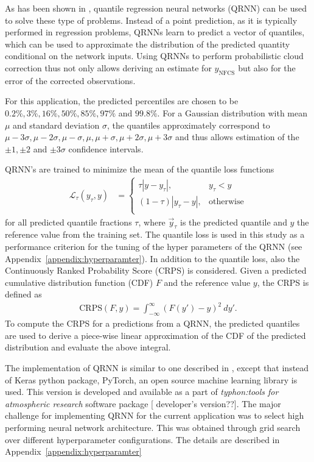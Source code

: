 \documentclass[amt, manuscript]{copernicus}
\newcommand{\todo}[1]{{\color{red} #1}}
\newcommand{\ynfcs}{y_\text{NFCS}}
\newcommand{\y}{\vec{y}}
\begin{document}
As has been shown in \citet{pfreundschuh:aneur:18}, quantile regression neural
networks (QRNN) can be used to solve these type of problems. Instead of a point
prediction, as it is typically performed in regression problems, QRNNs learn to
predict a vector of quantiles, which can be used to approximate the distribution
of the predicted quantity conditional on the network inputs. Using QRNNs to
perform probabilistic cloud correction thus not only allows deriving an estimate
for $\ynfcs$ but also for the error of the corrected observations.

For this application, the predicted percentiles are chosen to be
$0.2\%, 3\%, 16\%, 50\%, 85\%, 97\%$ and $99.8\%$. For a Gaussian
distribution with mean $\mu$ and standard deviation $\sigma$, the quantiles
approximately correspond to $\mu -3\sigma, \mu-2\sigma, \mu-\sigma
, \mu, \mu + \sigma, \mu + 2\sigma, \mu + 3\sigma$ and thus allows
estimation of the $\pm 1, \pm 2$ and $\pm 3\sigma$ confidence intervals.

QRNN's are trained to minimize the mean of the quantile loss functions
%
\begin{align}
  \mathcal{L}_\tau(y_\tau, y) &=
  \begin{cases}
    \tau|y - y_\tau|, & y_\tau < y \\ (1 - \tau)|y_\tau - y|, & \text{otherwise}
    \\
  \end{cases}
\end{align}
%
for all predicted quantile fractions $\tau$, where $\y_\tau$ is the predicted
quantile and $y$ the reference value from the training set. The quantile loss is
used in this study as a performance criterion for the tuning of the hyper
parameters of the QRNN (see Appendix~\ref{appendix:hyperparamter}). In addition to the quantile loss, also the Continuously
Ranked Probability Score (CRPS) is considered. Given a predicted cumulative
distribution function (CDF) $F$ and the reference value $y$, the CRPS is defined as
%
\begin{align}
  \text{CRPS}(F, y) = \int_{-\infty}^{\infty} \left (F(y') - y\right )^2\: dy'.
\end{align}
%
To compute the CRPS for a predictions from a QRNN, the predicted quantiles are
used to derive a piece-wise linear approximation of the CDF of the predicted
distribution and evaluate the above integral.

The implementation of QRNN is similar to one described in \citet{pfreundschuh:aneur:18}, except that instead of Keras python package, PyTorch, an open source machine learning
library \citep{paszke2017automatic} is used. This version is developed and available as a part of \textit{typhon:tools for atmospheric research} software package [\todo{developer's version??}]. The major challenge for implementing QRNN for the current application was to select high performing neural network architecture. This was obtained through grid search over different hyperparameter configurations. The details are described in Appendix~\ref{appendix:hyperparamter}
\end{document}
